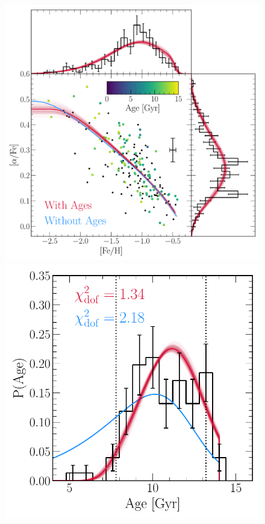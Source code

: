 \begin{figure}
\centering
\includegraphics[scale = 0.65]{gsefit_afe_feh.pdf}
\includegraphics[scale = 0.54]{gsefit_agedist.pdf}

\end{figure}

